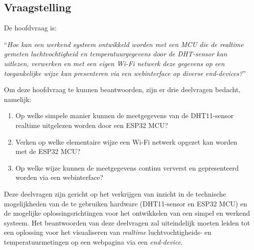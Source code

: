 \subsection{Vraagstelling}
De hoofdvraag is:
\begin{center}
    ``\textit{Hoe kan een werkend systeem ontwikkeld worden met een MCU die de realtime gemeten luchtvochtigheid en temperatuurgegevens door de DHT-sensor 
    kan uitlezen, verwerken en met een eigen Wi-Fi netwerk deze gegevens op een toegankelijke wijze kan presenteren via een webinterface op diverse end-devices?}''
\end{center}
Om deze hoofdvraag te kunnen beantwoorden, zijn er drie deelvragen bedacht, namelijk:
\begin{enumerate}[label=\textit{\Alph*}.]
    \item Op welke simpele manier kunnen de meetgegevens van de DHT11-sensor realtime uitgelezen worden door een ESP32 MCU?
    \item Verken op welke elementaire wijze een Wi-Fi netwerk opgezet kan worden met de ESP32 MCU?
    \item Op welke wijze kunnen de meetgegevens continu ververst en gepresenteerd worden via een webinterface?
\end{enumerate}
Deze deelvragen zijn gericht op het verkrijgen van inzicht in de technische mogelijkheden van de te gebruiken hardware (DHT11-sensor en ESP32 MCU) en de mogelijke 
oplossingsrichtingen voor het ontwikkelen van een simpel en werkend systeem. 
Het beantwoorden van deze deelvragen zal uiteindelijk moeten leiden tot een oplossing voor het visualiseren van \textit{realtime} luchtvochtigheids- en temperatuurmetingen op een webpagina via een \textit{end-device}.
